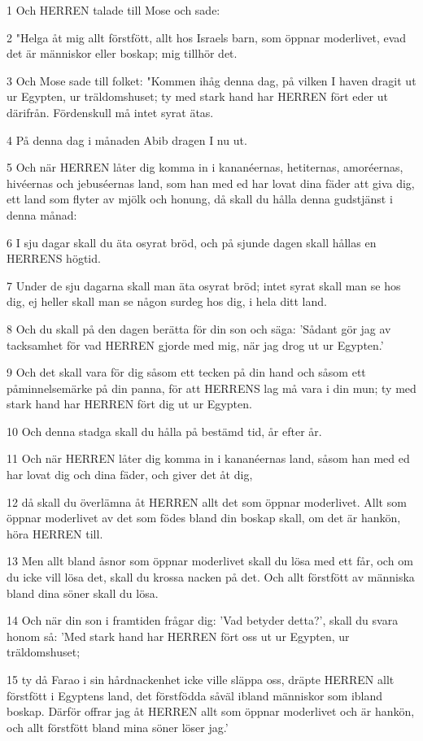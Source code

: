 \par 1 Och HERREN talade till Mose och sade:
\par 2 "Helga åt mig allt förstfött, allt hos Israels barn, som öppnar moderlivet, evad det är människor eller boskap; mig tillhör det.
\par 3 Och Mose sade till folket: "Kommen ihåg denna dag, på vilken I haven dragit ut ur Egypten, ur träldomshuset; ty med stark hand har HERREN fört eder ut därifrån. Fördenskull må intet syrat ätas.
\par 4 På denna dag i månaden Abib dragen I nu ut.
\par 5 Och när HERREN låter dig komma in i kananéernas, hetiternas, amoréernas, hivéernas och jebuséernas land, som han med ed har lovat dina fäder att giva dig, ett land som flyter av mjölk och honung, då skall du hålla denna gudstjänst i denna månad:
\par 6 I sju dagar skall du äta osyrat bröd, och på sjunde dagen skall hållas en HERRENS högtid.
\par 7 Under de sju dagarna skall man äta osyrat bröd; intet syrat skall man se hos dig, ej heller skall man se någon surdeg hos dig, i hela ditt land.
\par 8 Och du skall på den dagen berätta för din son och säga: 'Sådant gör jag av tacksamhet för vad HERREN gjorde med mig, när jag drog ut ur Egypten.'
\par 9 Och det skall vara för dig såsom ett tecken på din hand och såsom ett påminnelsemärke på din panna, för att HERRENS lag må vara i din mun; ty med stark hand har HERREN fört dig ut ur Egypten.
\par 10 Och denna stadga skall du hålla på bestämd tid, år efter år.
\par 11 Och när HERREN låter dig komma in i kananéernas land, såsom han med ed har lovat dig och dina fäder, och giver det åt dig,
\par 12 då skall du överlämna åt HERREN allt det som öppnar moderlivet. Allt som öppnar moderlivet av det som födes bland din boskap skall, om det är hankön, höra HERREN till.
\par 13 Men allt bland åsnor som öppnar moderlivet skall du lösa med ett får, och om du icke vill lösa det, skall du krossa nacken på det. Och allt förstfött av människa bland dina söner skall du lösa.
\par 14 Och när din son i framtiden frågar dig: 'Vad betyder detta?', skall du svara honom så: 'Med stark hand har HERREN fört oss ut ur Egypten, ur träldomshuset;
\par 15 ty då Farao i sin hårdnackenhet icke ville släppa oss, dräpte HERREN allt förstfött i Egyptens land, det förstfödda såväl ibland människor som ibland boskap. Därför offrar jag åt HERREN allt som öppnar moderlivet och är hankön, och allt förstfött bland mina söner löser jag.'
